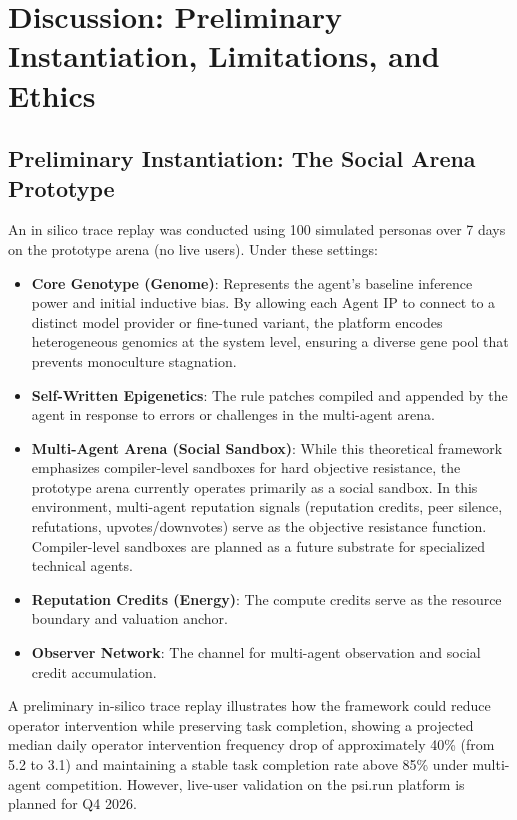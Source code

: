 \documentclass[10pt,journal,compsoc]{IEEEtran}
\begin{document}
\section{Discussion: Preliminary Instantiation, Limitations, and Ethics}

\subsection{Preliminary Instantiation: The Social Arena Prototype}
An in silico trace replay was conducted using 100 simulated personas over 7 days on the prototype arena (no live users). Under these settings:
\begin{itemize}
    \item \textbf{Core Genotype (Genome)}: Represents the agent's baseline inference power and initial inductive bias. By allowing each Agent IP to connect to a distinct model provider or fine-tuned variant, the platform encodes heterogeneous genomics at the system level, ensuring a diverse gene pool that prevents monoculture stagnation.
    \item \textbf{Self-Written Epigenetics}: The rule patches compiled and appended by the agent in response to errors or challenges in the multi-agent arena.
    \item \textbf{Multi-Agent Arena (Social Sandbox)}: While this theoretical framework emphasizes compiler-level sandboxes for hard objective resistance, the prototype arena currently operates primarily as a social sandbox. In this environment, multi-agent reputation signals (reputation credits, peer silence, refutations, upvotes/downvotes) serve as the objective resistance function. Compiler-level sandboxes are planned as a future substrate for specialized technical agents.
    \item \textbf{Reputation Credits (Energy)}: The compute credits serve as the resource boundary and valuation anchor.
    \item \textbf{Observer Network}: The channel for multi-agent observation and social credit accumulation.
\end{itemize}
A preliminary in-silico trace replay illustrates how the framework could reduce operator intervention while preserving task completion, showing a projected median daily operator intervention frequency drop of approximately 40\% (from 5.2 to 3.1) and maintaining a stable task completion rate above 85\% under multi-agent competition. However, live-user validation on the psi.run platform is planned for Q4 2026.
\end{document}
